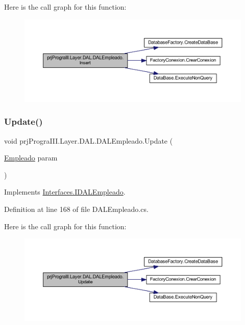 Here is the call graph for this function\+:
\nopagebreak
\begin{figure}[H]
\begin{center}
\leavevmode
\includegraphics[width=350pt]{classprj_progra_i_i_i_1_1_layer_1_1_d_a_l_1_1_d_a_l_empleado_a8593713e7bb16c32041cd8b342cfd3ec_cgraph}
\end{center}
\end{figure}
\hypertarget{classprj_progra_i_i_i_1_1_layer_1_1_d_a_l_1_1_d_a_l_empleado_ab97689057c451afa71447c434bbac131}{}\label{classprj_progra_i_i_i_1_1_layer_1_1_d_a_l_1_1_d_a_l_empleado_ab97689057c451afa71447c434bbac131} 
\subsubsection{\texorpdfstring{Update()}{Update()}}
{\footnotesize\ttfamily void prj\+Progra\+I\+I\+I.\+Layer.\+D\+A\+L.\+D\+A\+L\+Empleado.\+Update (\begin{DoxyParamCaption}\item[{\hyperlink{classprj_progra_i_i_i_1_1_layer_1_1_entities_1_1_empleado}{Empleado}}]{param }\end{DoxyParamCaption})}



Implements \hyperlink{interface_interfaces_1_1_i_d_a_l_empleado_a3e979162d517e91994750b5efc6451d9}{Interfaces.\+I\+D\+A\+L\+Empleado}.



Definition at line 168 of file D\+A\+L\+Empleado.\+cs.

Here is the call graph for this function\+:
\nopagebreak
\begin{figure}[H]
\begin{center}
\leavevmode
\includegraphics[width=350pt]{classprj_progra_i_i_i_1_1_layer_1_1_d_a_l_1_1_d_a_l_empleado_ab97689057c451afa71447c434bbac131_cgraph}
\end{center}
\end{figure}


